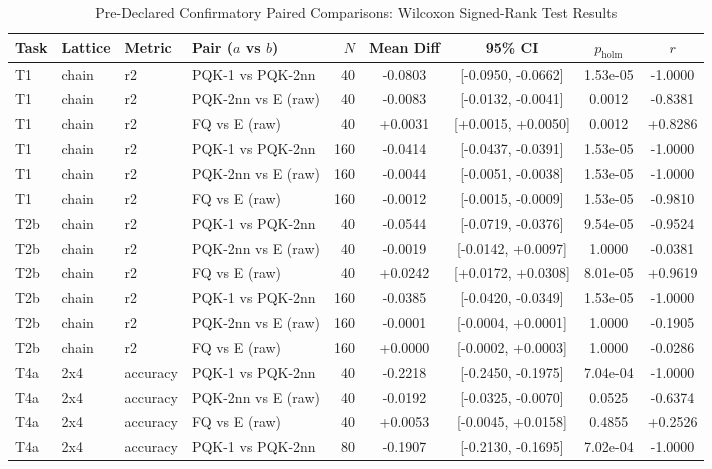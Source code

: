 \begingroup
\tiny
\setlength{\tabcolsep}{2.2pt}
\begin{table}[!t]
\centering
\caption{Pre-Declared Confirmatory Paired Comparisons: Wilcoxon Signed-Rank Test Results}
\label{tab:confirmatory_stats}
\begin{tabular}{@{}llllrcccc@{}}
\toprule
Task & Lattice & Metric & Pair ($a$ vs $b$) & $N$ & Mean Diff & 95\% CI & $p_{\mathrm{holm}}$ & $r$ \\
\midrule
T1 & chain & r2 & PQK-1 vs PQK-2nn & 40 & -0.0803 & [-0.0950, -0.0662] & 1.53e-05 & -1.0000 \\
T1 & chain & r2 & PQK-2nn vs E (raw) & 40 & -0.0083 & [-0.0132, -0.0041] & 0.0012 & -0.8381 \\
T1 & chain & r2 & FQ vs E (raw) & 40 & +0.0031 & [+0.0015, +0.0050] & 0.0012 & +0.8286 \\
T1 & chain & r2 & PQK-1 vs PQK-2nn & 160 & -0.0414 & [-0.0437, -0.0391] & 1.53e-05 & -1.0000 \\
T1 & chain & r2 & PQK-2nn vs E (raw) & 160 & -0.0044 & [-0.0051, -0.0038] & 1.53e-05 & -1.0000 \\
T1 & chain & r2 & FQ vs E (raw) & 160 & -0.0012 & [-0.0015, -0.0009] & 1.53e-05 & -0.9810 \\
T2b & chain & r2 & PQK-1 vs PQK-2nn & 40 & -0.0544 & [-0.0719, -0.0376] & 9.54e-05 & -0.9524 \\
T2b & chain & r2 & PQK-2nn vs E (raw) & 40 & -0.0019 & [-0.0142, +0.0097] & 1.0000 & -0.0381 \\
T2b & chain & r2 & FQ vs E (raw) & 40 & +0.0242 & [+0.0172, +0.0308] & 8.01e-05 & +0.9619 \\
T2b & chain & r2 & PQK-1 vs PQK-2nn & 160 & -0.0385 & [-0.0420, -0.0349] & 1.53e-05 & -1.0000 \\
T2b & chain & r2 & PQK-2nn vs E (raw) & 160 & -0.0001 & [-0.0004, +0.0001] & 1.0000 & -0.1905 \\
T2b & chain & r2 & FQ vs E (raw) & 160 & +0.0000 & [-0.0002, +0.0003] & 1.0000 & -0.0286 \\
T4a & 2x4 & accuracy & PQK-1 vs PQK-2nn & 40 & -0.2218 & [-0.2450, -0.1975] & 7.04e-04 & -1.0000 \\
T4a & 2x4 & accuracy & PQK-2nn vs E (raw) & 40 & -0.0192 & [-0.0325, -0.0070] & 0.0525 & -0.6374 \\
T4a & 2x4 & accuracy & FQ vs E (raw) & 40 & +0.0053 & [-0.0045, +0.0158] & 0.4855 & +0.2526 \\
T4a & 2x4 & accuracy & PQK-1 vs PQK-2nn & 80 & -0.1907 & [-0.2130, -0.1695] & 7.02e-04 & -1.0000 \\

\end{tabular}
\end{table}
